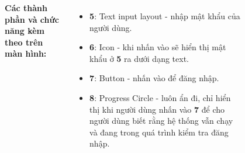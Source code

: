 \documentclass{beamer}
\begin{document}
\begin{frame}
\begin{columns}
\begin{figure}
        \end{figure}
        \indent \textbf{Các thành phần và chức năng kèm theo trên màn hình:}
        \begin{itemize}
            \item \textbf{5}: Text input layout - nhập mật khẩu của người dùng.
            \item \textbf{6}: Icon - khi nhấn vào sẽ hiển thị mật khẩu ở \textbf{5} ra dưới dạng text.
            \item \textbf{7}: Button - nhấn vào để đăng nhập.
            \item \textbf{8}: Progress Circle - luôn ẩn đi, chỉ hiển thị khi người dùng nhấn vào \textbf{7} để cho người dùng biết rằng hệ thống vẫn chạy và đang trong quá trình kiểm tra đăng nhập.
        \end{itemize}
    \end{columns}
\end{frame}
\end{document}
